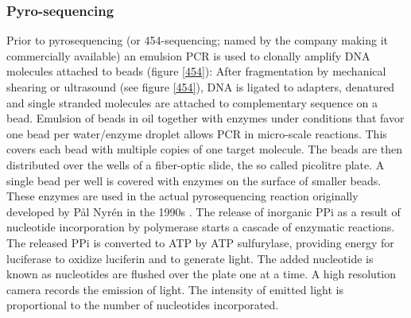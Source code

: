 \subsubsection{Pyro-sequencing}
\label{sec:pyro-seq}



Prior to pyrosequencing (or 454-sequencing; named by the company making
it commercially available) an emulsion PCR is used to clonally amplify
DNA molecules attached to beads (figure \ref{454}): After
fragmentation by mechanical shearing or ultrasound \cite{pmid20298868}
(see figure \ref{454}), DNA is ligated to adapters, denatured and
single stranded molecules are attached to complementary sequence on a
bead. Emulsion of beads in oil together with enzymes under conditions
that favor one bead per water/enzyme droplet allows PCR in
micro-scale reactions. This covers each bead with multiple copies of
one target molecule. The beads are then distributed over the wells of
a fiber-optic slide, the so called picolitre plate. A single bead per
well is covered with enzymes on the surface of smaller beads. These
enzymes are used in the actual pyrosequencing reaction originally
developed by P\r{a}l Nyr\'{e}n in the 1990s \cite{pmid17185753}. The
release of inorganic PPi as a result of nucleotide incorporation by
polymerase starts a cascade of enzymatic reactions. The released PPi
is converted to ATP by ATP sulfurylase, providing energy for
luciferase to oxidize luciferin and to generate light. The added
nucleotide is known as nucleotides are flushed over the plate one at a
time. A high resolution camera records the emission of light. The
intensity of emitted light is proportional to the number of
nucleotides incorporated.

